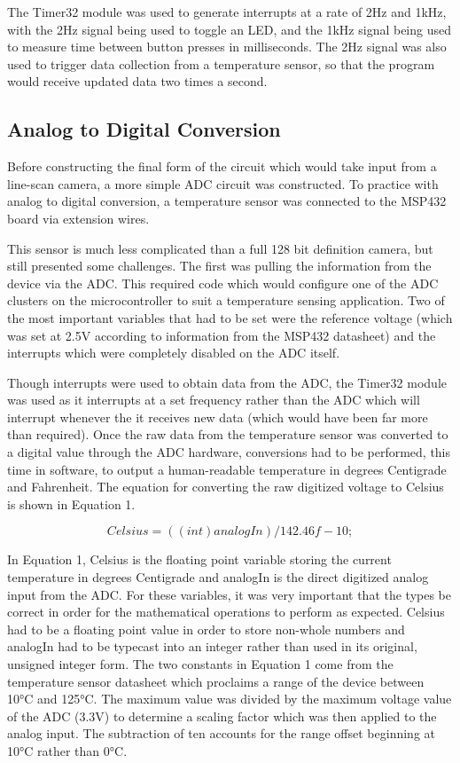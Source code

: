\documentclass[conference]{IEEEtran}
\begin{document}
The Timer32 module was used to generate interrupts at a rate of 2Hz and
1kHz, with the 2Hz signal being used to toggle an LED, and the 1kHz signal
being used to measure time between button presses in milliseconds. The 2Hz
signal was also used to trigger data collection from a temperature sensor,
so that the program would receive updated data two times a second.


\subsection{Analog to Digital Conversion}
Before constructing the final form of the circuit which would take input from a line-scan camera, a more simple ADC circuit was constructed. To practice with analog to digital conversion, a temperature sensor was connected to the MSP432 board via extension wires.

This sensor is much less complicated than a full 128 bit definition camera, but still presented some challenges. The first was pulling the information from the device via the ADC. This required code which would configure one of the ADC clusters on the microcontroller to suit a temperature sensing application. Two of the most important variables that had to be set were the reference voltage (which was set at 2.5V according to information from the MSP432 datasheet) and the interrupts which were completely disabled on the ADC itself.

Though interrupts were used to obtain data from the ADC, the Timer32 module was used as it interrupts at a set frequency rather than the ADC which will interrupt whenever the it receives new data (which would have been far more than required).
Once the raw data from the temperature sensor was converted to a digital value through the ADC hardware, conversions had to be performed, this time in software, to output a human-readable temperature in degrees Centigrade and Fahrenheit. The equation for converting the raw digitized voltage to Celsius is shown in Equation 1.

\begin{equation}
    Celsius = ((int) analogIn) / 142.46f - 10;
\end{equation}

In Equation 1, Celsius is the floating point variable storing the current temperature in degrees Centigrade and analogIn is the direct digitized analog input from the ADC. For these variables, it was very important that the types be correct in order for the mathematical operations to perform as expected. Celsius had to be a floating point value in order to store non-whole numbers and analogIn had to be typecast into an integer rather than used in its original, unsigned integer form. The two constants in Equation 1 come from the temperature sensor datasheet which proclaims a range of the device between 10°C and 125°C. The maximum value was divided by the maximum voltage value of the ADC (3.3V) to determine a scaling factor which was then applied to the analog input. The subtraction of ten accounts for the range offset beginning at 10°C rather than 0°C.
\end{document}
